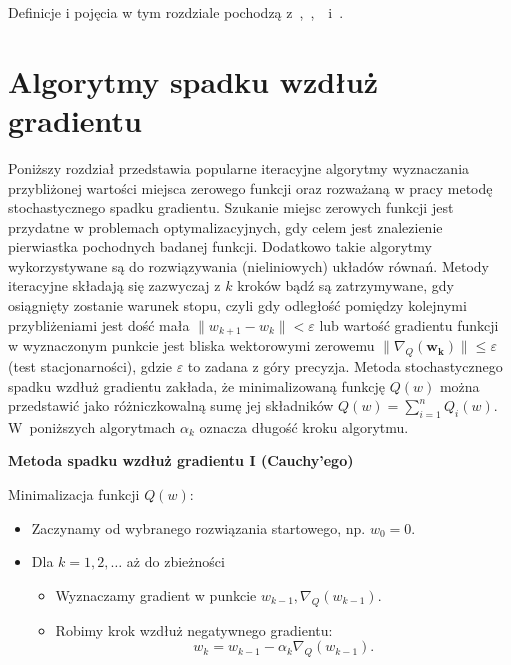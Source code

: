 Definicje i pojęcia w tym rozdziale pochodzą z~\cite{bott1},~\cite{bott2},~\cite{kotlowski}~i~\cite{fortuna}.

\newpage
\section{Algorytmy spadku wzdłuż gradientu}\label{R-N}

Poniższy rozdział przedstawia popularne iteracyjne algorytmy wyznaczania przybliżonej wartości miejsca zerowego funkcji oraz rozważaną w pracy metodę stochastycznego spadku gradientu. Szukanie miejsc zerowych funkcji jest przydatne w problemach optymalizacyjnych, gdy celem jest znalezienie pierwiastka pochodnych badanej funkcji. Dodatkowo takie algorytmy wykorzystywane są do rozwiązywania (nieliniowych) układów równań. Metody iteracyjne składają się zazwyczaj z $k$ kroków bądź są zatrzymywane, gdy osiągnięty zostanie warunek stopu, czyli gdy odległość pomiędzy kolejnymi przybliżeniami jest dość mała $\parallel w_{k+1}-w_k\parallel < \varepsilon$ lub wartość gradientu funkcji w wyznaczonym punkcie jest bliska wektorowymi zerowemu $\parallel \nabla_Q(\mathbf{w_k}) \parallel \leqslant \varepsilon$ (test stacjonarności), gdzie $\varepsilon$ to zadana z góry precyzja.
Metoda stochastycznego spadku wzdłuż gradientu zakłada, że minimalizowaną funkcję $Q(w)$ można przedstawić jako różniczkowalną sumę jej składników $Q(w) = \sum_{i=1}^{n}Q_i(w)$. W~poniższych algorytmach $\alpha_k$ oznacza długość kroku algorytmu.
\begin{center}
\textbf{Metoda spadku wzdłuż gradientu I (Cauchy’ego)}
\end{center}
Minimalizacja funkcji $Q(w)$:
\begin{itemize}
\item Zaczynamy od wybranego rozwiązania startowego, np. $w_{0} = 0$.
\item Dla $k = 1, 2, \dots$ aż do zbieżności
	\begin{itemize}
	\item Wyznaczamy gradient w punkcie $w_{k-1}, \nabla_{Q}(w_{k-1})$.
	\item Robimy krok wzdłuż negatywnego gradientu: $$w_{k} = w_{k-1} - \alpha_{k}\nabla_{Q}(w_{k-1}). $$
	\end{itemize}
\end{itemize}

